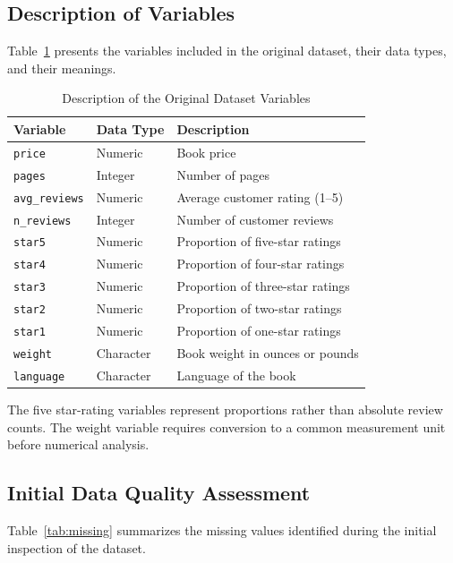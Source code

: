 \documentclass[11pt,a4paper]{article}
\begin{document}
\subsection{Description of Variables}
Table~\ref{tab:variables} presents the variables included
in the original dataset, their data types, and their meanings.
\begin{table}[H]
\centering
\small
\begin{tabular}{lll}
\toprule
Variable & Data Type & Description \\
\midrule
\texttt{price} & Numeric & Book price \\
\texttt{pages} & Integer & Number of pages \\
\texttt{avg\_reviews} & Numeric & Average customer rating (1--5) \\
\texttt{n\_reviews} & Integer & Number of customer reviews \\
\texttt{star5} & Numeric & Proportion of five-star ratings \\
\texttt{star4} & Numeric & Proportion of four-star ratings \\
\texttt{star3} & Numeric & Proportion of three-star ratings \\
\texttt{star2} & Numeric & Proportion of two-star ratings \\
\texttt{star1} & Numeric & Proportion of one-star ratings \\
\texttt{weight} & Character & Book weight in ounces or pounds \\
\texttt{language} & Character & Language of the book \\
\bottomrule
\end{tabular}
\caption{Description of the Original Dataset Variables}
\label{tab:variables}
\end{table}
The five star-rating variables represent proportions rather
than absolute review counts. The weight variable requires
conversion to a common measurement unit before numerical analysis.
\subsection{Initial Data Quality Assessment}
Table~\ref{tab:missing} summarizes the missing values
identified during the initial inspection of the dataset.
\end{document}
